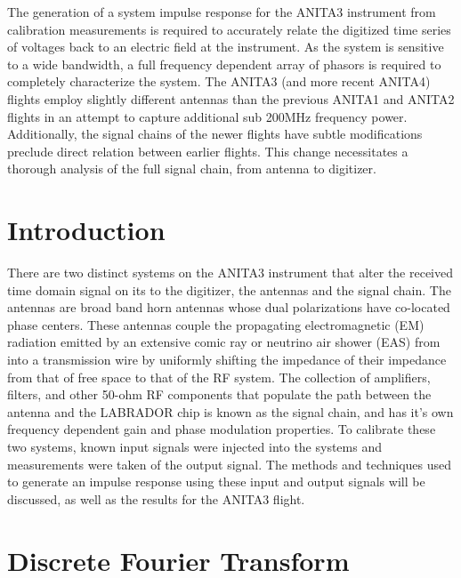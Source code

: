 %
%
%
%


	The generation of a system impulse response for the ANITA3 instrument from calibration measurements is required to accurately relate the digitized time series of voltages back to an electric field at the instrument.  As the system is sensitive to a wide bandwidth, a full frequency dependent array of phasors is required to completely characterize the system.  The ANITA3 (and more recent ANITA4) flights employ slightly different antennas than the previous ANITA1 and ANITA2 flights in an attempt to capture additional sub 200MHz frequency power. Additionally, the signal chains of the newer flights have subtle modifications preclude direct relation between earlier flights.  This change necessitates a thorough analysis of the full signal chain, from antenna to digitizer.
	
\section{Introduction}

	There are two distinct systems on the ANITA3 instrument that alter the received time domain signal on its to the digitizer, the antennas and the signal chain.  The antennas are broad band horn antennas whose dual polarizations have co-located phase centers.  These antennas couple the propagating electromagnetic (EM) radiation emitted by an extensive comic ray or neutrino air shower (EAS) from into a transmission wire by uniformly shifting the impedance of their impedance from that of free space to that of the RF system.  The collection of amplifiers, filters, and other 50-ohm RF components that populate the path between the antenna and the LABRADOR chip is known as the signal chain, and has it's own frequency dependent gain and phase modulation properties.  To calibrate these two systems, known input signals were injected into the systems and measurements were taken of the output signal.  The methods and techniques used to generate an impulse response using these input and output signals will be discussed, as well as the results for the ANITA3 flight.

\section{Discrete Fourier Transform}

